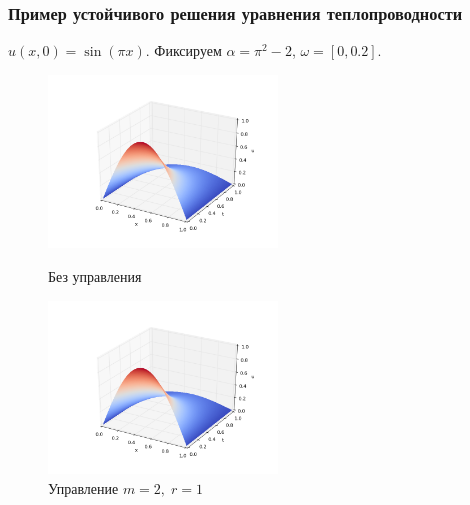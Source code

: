 \documentclass{beamer}
\begin{document}
\begin{frame}
\frametitle{Пример устойчивого решения уравнения теплопроводности}

$u(x, 0) = \sin{(\pi x)}$. Фиксируем $\alpha = \pi^2 - 2$, $\omega = [0, 0.2]$. 

\begin{figure}[H]
\centering
\begin{minipage}{.5\textwidth}
  \centering
  \includegraphics[width=2.4in]{par_ex_pim2}
  \caption{Без управления}
  \label{fig:test1}
\end{minipage}%
\begin{minipage}{.5\textwidth}
  \centering
  \includegraphics[width=2.4in]{par_re_pim2}
  \caption{Управление $m = 2,\; r = 1$}
  \label{fig:test2}
\end{minipage}
\end{figure}

\end{frame}
\end{document}
